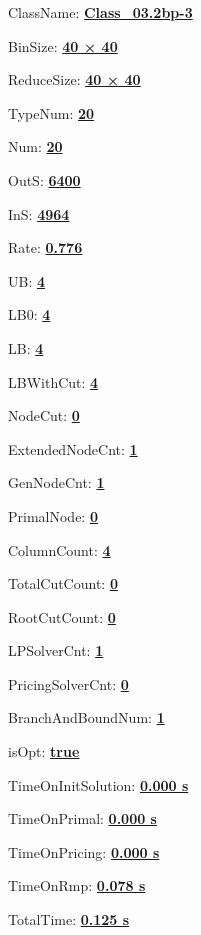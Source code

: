 \documentclass[11pt]{article}
\begin{document}
\pagestyle{empty}


ClassName: \underline{\textbf{Class_03.2bp-3}}
\par
BinSize: \underline{\textbf{40 × 40}}
\par
ReduceSize: \underline{\textbf{40 × 40}}
\par
TypeNum: \underline{\textbf{20}}
\par
Num: \underline{\textbf{20}}
\par
OutS: \underline{\textbf{6400}}
\par
InS: \underline{\textbf{4964}}
\par
Rate: \underline{\textbf{0.776}}
\par
UB: \underline{\textbf{4}}
\par
LB0: \underline{\textbf{4}}
\par
LB: \underline{\textbf{4}}
\par
LBWithCut: \underline{\textbf{4}}
\par
NodeCut: \underline{\textbf{0}}
\par
ExtendedNodeCnt: \underline{\textbf{1}}
\par
GenNodeCnt: \underline{\textbf{1}}
\par
PrimalNode: \underline{\textbf{0}}
\par
ColumnCount: \underline{\textbf{4}}
\par
TotalCutCount: \underline{\textbf{0}}
\par
RootCutCount: \underline{\textbf{0}}
\par
LPSolverCnt: \underline{\textbf{1}}
\par
PricingSolverCnt: \underline{\textbf{0}}
\par
BranchAndBoundNum: \underline{\textbf{1}}
\par
isOpt: \underline{\textbf{true}}
\par
TimeOnInitSolution: \underline{\textbf{0.000 s}}
\par
TimeOnPrimal: \underline{\textbf{0.000 s}}
\par
TimeOnPricing: \underline{\textbf{0.000 s}}
\par
TimeOnRmp: \underline{\textbf{0.078 s}}
\par
TotalTime: \underline{\textbf{0.125 s}}
\par
\newpage


\end{document}
